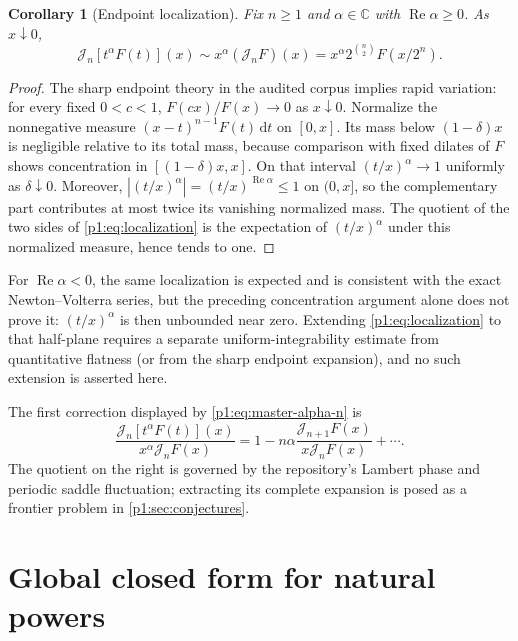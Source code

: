 \documentclass[11pt,oneside]{article}
\newtheorem{corollary}[theorem]{Corollary}
\theoremstyle{definition}
\theoremstyle{remark}
\newcommand{\C}{\mathbb C}
\newcommand{\dd}{\,\mathrm d}
\newcommand{\Jn}{\mathcal J}
\newcommand{\1}{\mathbf 1}
\DeclareMathOperator{\Rea}{Re}
\begin{document}
\begin{corollary}[Endpoint localization]\label{p1:cor:endpoint-localization}
Fix \(n\geq1\) and \(\alpha\in\C\) with \(\Rea\alpha\geq0\).  As
\(x\downarrow0\),
\begin{equation}
 \Jn_n[t^\alpha F(t)](x)
 \sim x^\alpha(\Jn_nF)(x)
 =x^\alpha2^{\binom n2}F(x/2^n).                               \label{p1:eq:localization}
\end{equation}
\end{corollary}

\begin{proof}
The sharp endpoint theory in the audited corpus implies rapid variation:
for every fixed \(0<c<1\), \(F(cx)/F(x)\to0\) as \(x\downarrow0\).  Normalize
the nonnegative measure
\((x-t)^{n-1}F(t)\dd t\) on \([0,x]\).  Its mass below \((1-\delta)x\) is
negligible relative to its total mass, because comparison with fixed dilates
of \(F\) shows concentration in \([(1-\delta)x,x]\).  On that interval
\((t/x)^\alpha\to1\) uniformly as \(\delta\downarrow0\).  Moreover,
\(|(t/x)^\alpha|=(t/x)^{\Rea\alpha}\leq1\) on \((0,x]\), so the complementary
part contributes at most twice its vanishing normalized mass.  The quotient of
the two sides of \eqref{p1:eq:localization} is the expectation of
\((t/x)^\alpha\) under this normalized measure, hence tends to one.
\end{proof}

For \(\Rea\alpha<0\), the same localization is expected and is consistent
with the exact Newton--Volterra series, but the preceding concentration
argument alone does not prove it: \((t/x)^\alpha\) is then unbounded near
zero.  Extending \eqref{p1:eq:localization} to that half-plane requires a separate
uniform-integrability estimate from quantitative flatness (or from the sharp
endpoint expansion), and no such extension is asserted here.

The first correction displayed by \eqref{p1:eq:master-alpha-n} is
\begin{equation}
 \frac{\Jn_n[t^\alpha F(t)](x)}{x^\alpha\Jn_nF(x)}
 =1-n\alpha\frac{\Jn_{n+1}F(x)}{x\Jn_nF(x)}+\cdots.             \label{p1:eq:first-local-correction}
\end{equation}
The quotient on the right is governed by the repository's Lambert phase and
periodic saddle fluctuation; extracting its complete expansion is posed as a
frontier problem in \cref{p1:sec:conjectures}.

\section{Global closed form for natural powers}
\end{document}
